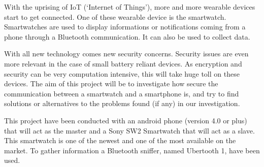 With the uprising of IoT (‘Internet of Things’), more and more wearable devices start to get connected. One of these wearable device is the smartwatch. Smartwatches are used to display informations or notifications coming from a phone through a Bluetooth communication. It can also be used to collect data.


With all new technology comes new security concerns. Security issues are even more relevant in the case of small battery reliant devices. As encryption and security can be very computation intensive, this will take huge toll on these devices. The aim of this project will be to investigate how secure the communication between a smartwatch and a smartphone is, and try to find solutions or alternatives to the problems found (if any) in our investigation.


This project have been conducted with an android phone (version 4.0 or plus) that will act as the master and a Sony SW2 Smartwatch that will act as a slave. This smartwatch is one of the newest and one of the most available on the market. To gather information a Bluetooth sniffer, named Ubertooth 1, have been used.